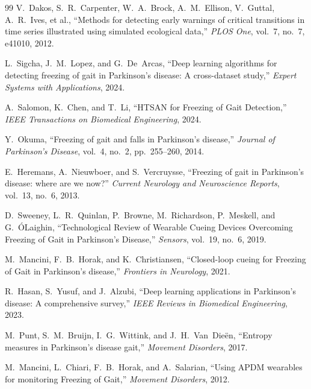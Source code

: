 \documentclass[12pt,a4paper,oneside]{report}
\numberwithin{equation}{chapter}
\numberwithin{figure}{chapter}
\numberwithin{table}{chapter}
\begin{document}
\begin{thebibliography}{99}
V.~Dakos, S.~R.~Carpenter, W.~A.~Brock, A.~M.~Ellison, V.~Guttal, A.~R.~Ives, et al., ``Methods for detecting early warnings of critical transitions in time series illustrated using simulated ecological data,'' \textit{PLOS One}, vol.~7, no.~7, e41010, 2012.

L.~Sigcha, J.~M.~Lopez, and G.~De~Arcas, ``Deep learning algorithms for detecting freezing of gait in Parkinson's disease: A cross-dataset study,'' \textit{Expert Systems with Applications}, 2024.

A.~Salomon, K.~Chen, and T.~Li, ``HTSAN for Freezing of Gait Detection,'' \textit{IEEE Transactions on Biomedical Engineering}, 2024.

Y.~Okuma, ``Freezing of gait and falls in Parkinson's disease,'' \textit{Journal of Parkinson's Disease}, vol.~4, no.~2, pp.~255--260, 2014.

E.~Heremans, A.~Nieuwboer, and S.~Vercruysse, ``Freezing of gait in Parkinson's disease: where are we now?'' \textit{Current Neurology and Neuroscience Reports}, vol.~13, no.~6, 2013.

D.~Sweeney, L.~R.~Quinlan, P.~Browne, M.~Richardson, P.~Meskell, and G.~\'{O}Laighin, ``Technological Review of Wearable Cueing Devices Overcoming Freezing of Gait in Parkinson's Disease,'' \textit{Sensors}, vol.~19, no.~6, 2019.

M.~Mancini, F.~B.~Horak, and K.~Christiansen, ``Closed-loop cueing for Freezing of Gait in Parkinson's disease,'' \textit{Frontiers in Neurology}, 2021.

R.~Hasan, S.~Yusuf, and J.~Alzubi, ``Deep learning applications in Parkinson's disease: A comprehensive survey,'' \textit{IEEE Reviews in Biomedical Engineering}, 2023.

M.~Punt, S.~M.~Bruijn, I.~G.~Wittink, and J.~H.~Van~Die\"{e}n, ``Entropy measures in Parkinson's disease gait,'' \textit{Movement Disorders}, 2017.

M.~Mancini, L.~Chiari, F.~B.~Horak, and A.~Salarian, ``Using APDM wearables for monitoring Freezing of Gait,'' \textit{Movement Disorders}, 2012.

\end{thebibliography}
\end{document}
